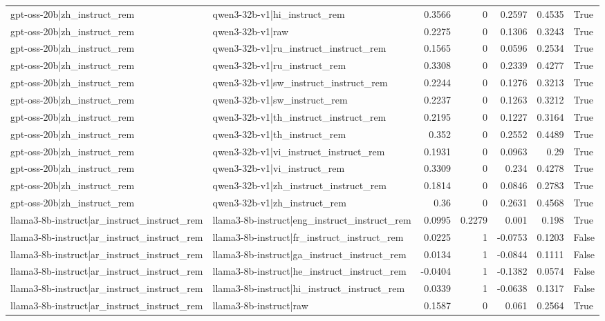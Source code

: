 \begin{table}
\begin{tabular}{l l r r r r l}
gpt-oss-20b|zh_instruct_rem & qwen3-32b-v1|hi_instruct_rem & 0.3566 & 0 & 0.2597 & 0.4535 & True \\
gpt-oss-20b|zh_instruct_rem & qwen3-32b-v1|raw & 0.2275 & 0 & 0.1306 & 0.3243 & True \\
gpt-oss-20b|zh_instruct_rem & qwen3-32b-v1|ru_instruct_instruct_rem & 0.1565 & 0 & 0.0596 & 0.2534 & True \\
gpt-oss-20b|zh_instruct_rem & qwen3-32b-v1|ru_instruct_rem & 0.3308 & 0 & 0.2339 & 0.4277 & True \\
gpt-oss-20b|zh_instruct_rem & qwen3-32b-v1|sw_instruct_instruct_rem & 0.2244 & 0 & 0.1276 & 0.3213 & True \\
gpt-oss-20b|zh_instruct_rem & qwen3-32b-v1|sw_instruct_rem & 0.2237 & 0 & 0.1263 & 0.3212 & True \\
gpt-oss-20b|zh_instruct_rem & qwen3-32b-v1|th_instruct_instruct_rem & 0.2195 & 0 & 0.1227 & 0.3164 & True \\
gpt-oss-20b|zh_instruct_rem & qwen3-32b-v1|th_instruct_rem & 0.352 & 0 & 0.2552 & 0.4489 & True \\
gpt-oss-20b|zh_instruct_rem & qwen3-32b-v1|vi_instruct_instruct_rem & 0.1931 & 0 & 0.0963 & 0.29 & True \\
gpt-oss-20b|zh_instruct_rem & qwen3-32b-v1|vi_instruct_rem & 0.3309 & 0 & 0.234 & 0.4278 & True \\
gpt-oss-20b|zh_instruct_rem & qwen3-32b-v1|zh_instruct_instruct_rem & 0.1814 & 0 & 0.0846 & 0.2783 & True \\
gpt-oss-20b|zh_instruct_rem & qwen3-32b-v1|zh_instruct_rem & 0.36 & 0 & 0.2631 & 0.4568 & True \\
llama3-8b-instruct|ar_instruct_instruct_rem & llama3-8b-instruct|eng_instruct_instruct_rem & 0.0995 & 0.2279 & 0.001 & 0.198 & True \\
llama3-8b-instruct|ar_instruct_instruct_rem & llama3-8b-instruct|fr_instruct_instruct_rem & 0.0225 & 1 & -0.0753 & 0.1203 & False \\
llama3-8b-instruct|ar_instruct_instruct_rem & llama3-8b-instruct|ga_instruct_instruct_rem & 0.0134 & 1 & -0.0844 & 0.1111 & False \\
llama3-8b-instruct|ar_instruct_instruct_rem & llama3-8b-instruct|he_instruct_instruct_rem & -0.0404 & 1 & -0.1382 & 0.0574 & False \\
llama3-8b-instruct|ar_instruct_instruct_rem & llama3-8b-instruct|hi_instruct_instruct_rem & 0.0339 & 1 & -0.0638 & 0.1317 & False \\
llama3-8b-instruct|ar_instruct_instruct_rem & llama3-8b-instruct|raw & 0.1587 & 0 & 0.061 & 0.2564 & True \\

\end{tabular}
\end{table}
